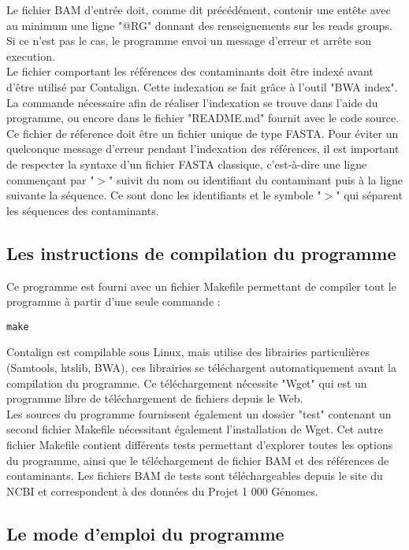 \documentclass[a4paper,12pt]{article}
\begin{document}
Le fichier BAM d'entrée doit, comme dit précédément, contenir une entête avec au minimum une ligne "@RG" donnant des renseignements sur les reads groups. Si ce n'est pas le cas, le programme envoi un message d'erreur et arrête son execution. \\

Le fichier comportant les références des contaminants doit être indexé avant d'être utilisé par Contalign. Cette indexation se fait grâce à l'outil "BWA index". La commande nécessaire afin de réaliser l'indexation se trouve dans l'aide du programme, ou encore dans le fichier "README.md" fournit avec le code source. Ce fichier de réference doit être un fichier unique de type FASTA. Pour éviter un quelconque message d'erreur pendant l'indexation des références, il est important de respecter la syntaxe d'un fichier FASTA classique, c'est-à-dire une ligne commençant par "$>$" suivit du nom ou identifiant du contaminant puis à la ligne suivante la séquence. Ce sont donc les identifiants et le symbole "$>$" qui séparent les séquences des contaminants.
\\
\subsection{Les instructions de compilation du programme}
Ce programme est fourni avec un fichier Makefile permettant de compiler tout le programme à partir d'une seule commande :

\lstset{language=C, basicstyle=\small\ttfamily, breaklines,prebreak= , postbreak= , frame=shadowbox}
\begin{lstlisting} 
make 
\end{lstlisting} 
Contalign est compilable sous Linux, mais utilise des librairies particulières (Samtools, htslib, BWA), ces librairies se téléchargent automatiquement avant la compilation du programme. Ce téléchargement nécessite "Wget" qui est un programme libre de téléchargement de fichiers depuis le Web. \\ Les sources du programme fournissent également un dossier "test" contenant un second fichier Makefile nécessitant également l'installation de Wget. Cet autre fichier Makefile contient différents tests permettant d'explorer toutes les options du programme, ainsi que le téléchargement de fichier BAM et des références de contaminants. Les fichiers BAM de tests sont téléchargeables depuis le site du NCBI et correspondent à des données du Projet 1 000 Génomes. 
\subsection{Le mode d'emploi du programme}
\end{document}
